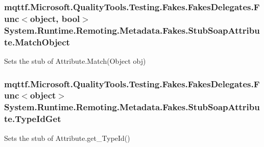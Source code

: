 \hypertarget{class_system_1_1_runtime_1_1_remoting_1_1_metadata_1_1_fakes_1_1_stub_soap_attribute_a5356dba4555cabc76bfd863f25f66218}{
\subsubsection[{Match\-Object}]{\setlength{\rightskip}{0pt plus 5cm}mqttf.\-Microsoft.\-Quality\-Tools.\-Testing.\-Fakes.\-Fakes\-Delegates.\-Func$<$object, bool$>$ System.\-Runtime.\-Remoting.\-Metadata.\-Fakes.\-Stub\-Soap\-Attribute.\-Match\-Object}}\label{class_system_1_1_runtime_1_1_remoting_1_1_metadata_1_1_fakes_1_1_stub_soap_attribute_a5356dba4555cabc76bfd863f25f66218}


Sets the stub of Attribute.\-Match(\-Object obj)

\hypertarget{class_system_1_1_runtime_1_1_remoting_1_1_metadata_1_1_fakes_1_1_stub_soap_attribute_aceba6c06ada51cec9dbc5792cd12331f}{
\subsubsection[{Type\-Id\-Get}]{\setlength{\rightskip}{0pt plus 5cm}mqttf.\-Microsoft.\-Quality\-Tools.\-Testing.\-Fakes.\-Fakes\-Delegates.\-Func$<$object$>$ System.\-Runtime.\-Remoting.\-Metadata.\-Fakes.\-Stub\-Soap\-Attribute.\-Type\-Id\-Get}}\label{class_system_1_1_runtime_1_1_remoting_1_1_metadata_1_1_fakes_1_1_stub_soap_attribute_aceba6c06ada51cec9dbc5792cd12331f}


Sets the stub of Attribute.\-get\-\_\-\-Type\-Id()

